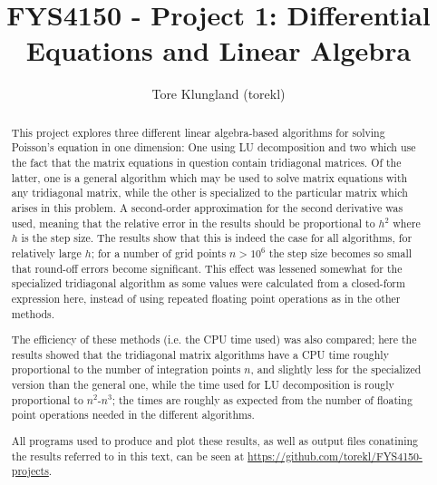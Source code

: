 \documentclass[a4paper,english]{article}
\title{FYS4150 - Project 1: Differential Equations and Linear Algebra}
\author{Tore Klungland (torekl)}
\begin{document}
\maketitle
\begin{abstract}
  This project explores three different linear algebra-based algorithms for solving Poisson's equation in one dimension: One using LU decomposition and two which use the fact that the matrix equations in question contain tridiagonal matrices. Of the latter, one is a general algorithm which may be used to solve matrix equations with any tridiagonal matrix, while the other is specialized to the particular matrix which arises in this problem. A second-order approximation for the second derivative was used, meaning that the relative error in the results should be proportional to $h^2$ where $h$ is the step size. The results show that this is indeed the case for all algorithms, for relatively large $h$; for a number of grid points $n>10^6$ the step size becomes so small that round-off errors become significant. This effect was lessened somewhat for the specialized tridiagonal algorithm as some values were calculated from a closed-form expression here, instead of using repeated floating point operations as in the other methods. \par
  The efficiency of these methods (i.e. the CPU time used) was also compared; here the results showed that the tridiagonal matrix algorithms have a CPU time roughly proportional to the number of integration points $n$, and slightly less for the specialized version than the general one, while the time used for LU decomposition is rougly proportional to $n^2$-$n^3$; the times are roughly as expected from the number of floating point operations needed in the different algorithms. \par
  All programs used to produce and plot these results, as well as output files conatining the results referred to in this text, can be seen at \url{https://github.com/torekl/FYS4150-projects}.
\end{abstract}
\end{document}
